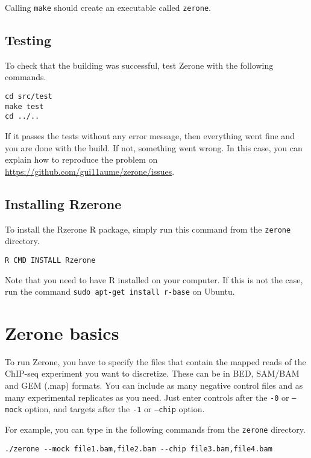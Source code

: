 \documentclass[12pt]{article}
\begin{document}
Calling \texttt{make} should create an executable called \texttt{zerone}.

\subsection{Testing}

To check that the building was successful, test Zerone with
the following commands.

\begin{verbatim}
cd src/test
make test
cd ../..
\end{verbatim}

If it passes the tests without any error message, then everything went fine
and you are done with the build. If not, something went
wrong. In this case, you can explain how to reproduce the problem
on \url{https://github.com/gui11aume/zerone/issues}.

\subsection*{Installing Rzerone}

To install the Rzerone R package, simply run this command from the
\texttt{zerone} directory.

\begin{verbatim}
R CMD INSTALL Rzerone
\end{verbatim}

Note that you need to have R installed on your computer. If this is not the
case, run the command \texttt{sudo apt-get install r-base} on Ubuntu.

\section{Zerone basics}

To run Zerone, you have to specify the files that contain the mapped reads
of the ChIP-seq experiment you want to discretize. These can be in BED,
SAM/BAM and GEM (.map) formats. You can include as many negative control
files and as many experimental replicates as you need. Just enter controls
after the \texttt{-0} or \texttt{--mock} option, and targets
after the \texttt{-1} or \texttt{--chip} option.

For example, you can type in the following commands from the \texttt{zerone}
directory.

\begin{verbatim}
./zerone --mock file1.bam,file2.bam --chip file3.bam,file4.bam
\end{verbatim}
\end{document}
